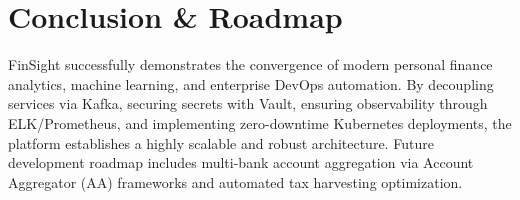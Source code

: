 \documentclass[12pt,a4paper]{report}
\begin{document}
\chapter{Conclusion \& Roadmap}

FinSight successfully demonstrates the convergence of modern personal finance analytics, machine learning, and enterprise DevOps automation. By decoupling services via Kafka, securing secrets with Vault, ensuring observability through ELK/Prometheus, and implementing zero-downtime Kubernetes deployments, the platform establishes a highly scalable and robust architecture. Future development roadmap includes multi-bank account aggregation via Account Aggregator (AA) frameworks and automated tax harvesting optimization.
\end{document}
